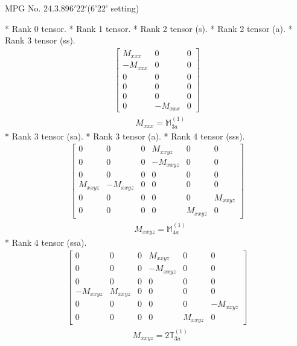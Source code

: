 \documentclass[fleqn,8pt,landscape]{jsarticle}
\begin{document}
\setcounter{MaxMatrixCols}{32}

\renewcommand{\tablename}{Table~}
\renewcommand{\figurename}{Figure~}
\begin{center}
\LARGE
MPG No. 24.3.89\quad$6'22'$\quad(6'22' setting)
\end{center}
* Rank 0 tensor.
* Rank 1 tensor.
* Rank 2 tensor (s).
* Rank 2 tensor (a).
* Rank 3 tensor (ss).
\begin{align*}
\begin{bmatrix} M_{xxx} & 0 & 0 \\ - M_{xxx} & 0 & 0 \\ 0 & 0 & 0 \\ 0 & 0 & 0 \\ 0 & 0 & 0 \\ 0 & - M_{xxx} & 0 \end{bmatrix}
\end{align*}
\begin{align*}
& M_{xxx} = \mathbb{M}_{3a}^{(1)}
\end{align*}
* Rank 3 tensor (sa).
* Rank 3 tensor (a).
* Rank 4 tensor (sss).
\begin{align*}
\begin{bmatrix} 0 & 0 & 0 & M_{xxyz} & 0 & 0 \\ 0 & 0 & 0 & - M_{xxyz} & 0 & 0 \\ 0 & 0 & 0 & 0 & 0 & 0 \\ M_{xxyz} & - M_{xxyz} & 0 & 0 & 0 & 0 \\ 0 & 0 & 0 & 0 & 0 & M_{xxyz} \\ 0 & 0 & 0 & 0 & M_{xxyz} & 0 \end{bmatrix}
\end{align*}
\begin{align*}
& M_{xxyz} = \mathbb{M}_{4a}^{(1)}
\end{align*}
* Rank 4 tensor (ssa).
\begin{align*}
\begin{bmatrix} 0 & 0 & 0 & M_{xxyz} & 0 & 0 \\ 0 & 0 & 0 & - M_{xxyz} & 0 & 0 \\ 0 & 0 & 0 & 0 & 0 & 0 \\ - M_{xxyz} & M_{xxyz} & 0 & 0 & 0 & 0 \\ 0 & 0 & 0 & 0 & 0 & - M_{xxyz} \\ 0 & 0 & 0 & 0 & M_{xxyz} & 0 \end{bmatrix}
\end{align*}
\begin{align*}
& M_{xxyz} = 2 \mathbb{T}_{3a}^{(1)}
\end{align*}
\end{document}
